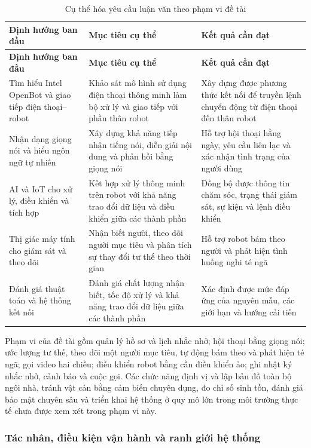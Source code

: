 \begin{longtable}{|p{4.0cm}|p{5.0cm}|p{4.5cm}|}
\caption{Cụ thể hóa yêu cầu luận văn theo phạm vi đề tài}\label{tab:thesis_requirement_refinement}\\
\hline
\textbf{Định hướng ban đầu} & \textbf{Mục tiêu cụ thể} & \textbf{Kết quả cần đạt} \\
\hline
\endfirsthead
\hline
\textbf{Định hướng ban đầu} & \textbf{Mục tiêu cụ thể} & \textbf{Kết quả cần đạt} \\
\hline
\endhead
Tìm hiểu Intel OpenBot và giao tiếp điện thoại--robot & Khảo sát mô hình sử dụng điện thoại thông minh làm bộ xử lý và giao tiếp với phần thân robot & Xây dựng được phương thức kết nối để truyền lệnh chuyển động từ điện thoại đến thân robot \\
\hline
Nhận dạng giọng nói và hiểu ngôn ngữ tự nhiên & Xây dựng khả năng tiếp nhận tiếng nói, diễn giải nội dung và phản hồi bằng giọng nói & Hỗ trợ hội thoại hằng ngày, yêu cầu liên lạc và xác nhận tình trạng của người dùng \\
\hline
AI và IoT cho xử lý, điều khiển và tích hợp & Kết hợp xử lý thông minh trên robot với khả năng trao đổi dữ liệu và điều khiển giữa các thành phần & Đồng bộ được thông tin chăm sóc, trạng thái giám sát, sự kiện và lệnh điều khiển \\
\hline
Thị giác máy tính cho giám sát và theo dõi & Nhận biết người, theo dõi người mục tiêu và phân tích sự thay đổi tư thế theo thời gian & Hỗ trợ robot bám theo người và phát hiện tình huống nghi té ngã \\
\hline
Đánh giá thuật toán và hệ thống kết nối & Đánh giá chất lượng nhận biết, tốc độ xử lý và khả năng trao đổi dữ liệu giữa các thành phần & Xác định được mức đáp ứng của nguyên mẫu, các giới hạn và hướng cải tiến \\
\hline
\end{longtable}

Phạm vi của đề tài gồm quản lý hồ sơ và lịch nhắc nhở; hội thoại bằng giọng nói; ước lượng tư thế, theo dõi một người mục tiêu, tự động bám theo và phát hiện té ngã; gọi video hai chiều; điều khiển robot bằng cần điều khiển ảo; ghi nhật ký nhắc nhở, cảnh báo và cuộc gọi. Các chức năng định vị và lập bản đồ toàn bộ ngôi nhà, tránh vật cản bằng cảm biến chuyên dụng, đo chỉ số sinh tồn, đánh giá bảo mật chuyên sâu và triển khai hệ thống ở quy mô lớn trong môi trường thực tế chưa được xem xét trong phạm vi này.

\subsubsection{Tác nhân, điều kiện vận hành và ranh giới hệ thống}

